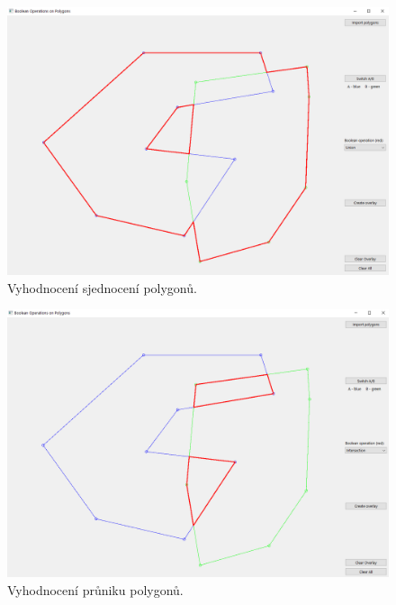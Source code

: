 \documentclass[a4paper, 12pt, oneside, titlepage]{article} %
\begin{document}
\begin{figure}[!htb]
	\centering
	\includegraphics[scale=0.4]{obrazky/sjednoceni.png} 
	\caption{Vyhodnocení sjednocení polygonů.
	}
	\label{fig:sjednoceni}
\end{figure} 
\FloatBarrier

\begin{figure}[!htb]
	\centering
	\includegraphics[scale=0.4]{obrazky/prunik.png} 
	\caption{Vyhodnocení průniku polygonů.
	}
	\label{fig:prunik}
\end{figure} 
\FloatBarrier
\end{document}
